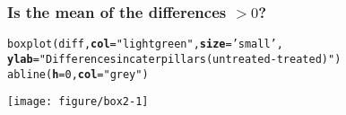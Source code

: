\documentclass[color=usenames,dvipsnames]{beamer}\usepackage[]{graphicx}\usepackage[]{color}
\makeatletter
\newcommand{\hlnum}[1]{\textcolor[rgb]{0.69,0.494,0}{#1}}%
\newcommand{\hlstr}[1]{\textcolor[rgb]{0.749,0.012,0.012}{#1}}%
\newcommand{\hlstd}[1]{\textcolor[rgb]{0,0,0}{#1}}%
\newcommand{\hlkwc}[1]{\textcolor[rgb]{0,0,0}{\textbf{#1}}}%
\newcommand{\hlkwd}[1]{\textcolor[rgb]{0.004,0.004,0.506}{#1}}%
\newenvironment{kframe}{%
 \def\at@end@of@kframe{}%
 \ifinner\ifhmode%
  \def\at@end@of@kframe{\end{minipage}}%
  \begin{minipage}{\columnwidth}%
 \fi\fi%
 \def\FrameCommand##1{\hskip\@totalleftmargin \hskip-\fboxsep
 \colorbox{shadecolor}{##1}\hskip-\fboxsep
     \hskip-\linewidth \hskip-\@totalleftmargin \hskip\columnwidth}%
 \MakeFramed {\advance\hsize-\width
   \@totalleftmargin\z@ \linewidth\hsize
   \@setminipage}}%
 {\par\unskip\endMakeFramed%
 \at@end@of@kframe}
\newenvironment{knitrout}{}{} %
\makeatother
\begin{document}
\begin{frame}[fragile]
  \frametitle{Is the mean of the differences $>0$?}
  \footnotesize
\begin{knitrout}
\color{fgcolor}\begin{kframe}
\begin{alltt}
\hlkwd{boxplot}\hlstd{(diff,} \hlkwc{col}\hlstd{=}\hlstr{"lightgreen"}\hlstd{,} \hlkwc{size}\hlstd{=}\hlstr{'small'}\hlstd{,}
        \hlkwc{ylab}\hlstd{=}\hlstr{"Differences in caterpillars (untreated-treated)"}\hlstd{)}
\hlkwd{abline}\hlstd{(}\hlkwc{h}\hlstd{=}\hlnum{0}\hlstd{,} \hlkwc{col}\hlstd{=}\hlstr{"grey"}\hlstd{)}
\end{alltt}
\end{kframe}
\end{knitrout}
\vspace{-.2cm}
  \begin{center}
    \texttt{[image: figure/box2-1]}
  \end{center}
\end{frame}



\begin{comment}
\begin{frame}[fragile]
  \frametitle{Is the mean of the differences $>0$?}
  \begin{center}
  \footnotesize
\texttt{[image: figure/pplot-1]}
  \end{center}
\end{frame}
\end{comment}



\begin{comment}
\begin{frame}[fragile]
  \frametitle{The differences}
\begin{center}
  \footnotesize

\texttt{[image: figure/diff-1]}
\end{center}
\end{frame}
\end{comment}
\end{document}
